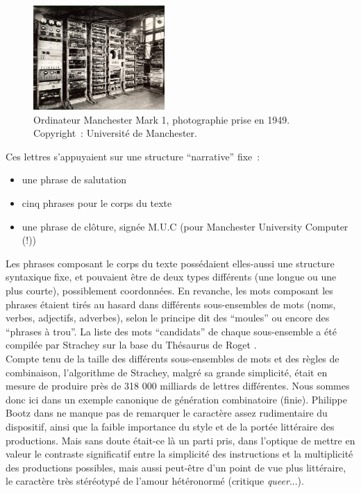 \documentclass{article}
\begin{document}
				\begin{figure}
					\centering
					\includegraphics[width=5cm]{manchester_mark_1.jpg}
					\caption{Ordinateur Manchester Mark 1, photographie prise en 1949. Copyright~: Université de Manchester.}
					\label{fig:manchester_mark_1}
				\end{figure}
				Ces lettres s'appuyaient sur une structure ``narrative'' fixe~:
				\vspace{2mm}
				\begin{itemize}
					\item une phrase de salutation
					\item cinq phrases pour le corps du texte
					\item une phrase de clôture, signée M.U.C (pour Manchester University Computer (!))
				\end{itemize}
				\vspace{2mm}
				Les phrases composant le corps du texte possédaient elles-aussi une structure syntaxique fixe, et pouvaient être de deux types différents (une longue ou une plus courte), possiblement coordonnées. En revanche, les mots composant les phrases étaient tirés au hasard dans différents sous-ensembles de mots (noms, verbes, adjectifs, adverbes), selon le principe dit des ``moules'' ou encore des ``phrases à trou''.  La liste des mots ``candidats'' de chaque sous-ensemble a été compilée par Strachey sur la base du Thésaurus de Roget \cite{wiki:roget}.\\
				
				Compte tenu de la taille des différents sous-ensembles de mots et des règles de combinaison, l'algorithme de Strachey, malgré sa grande simplicité, était en mesure  de produire près de 318 000 milliards de lettres différentes.  Nous sommes donc ici dans un exemple canonique de génération combinatoire (finie). Philippe Bootz dans \cite{bootz} ne manque pas de remarquer le caractère assez rudimentaire du dispositif, ainsi que la faible importance du style et de la portée littéraire des productions. Mais sans doute était-ce là un parti pris, dans l'optique de mettre en valeur le contraste significatif entre la simplicité des instructions et la multiplicité des productions possibles, mais aussi  peut-être d'un point de vue plus littéraire, le caractère très stéréotypé de l'amour hétéronormé (critique \textit{queer}...).\\
				
\end{document}
